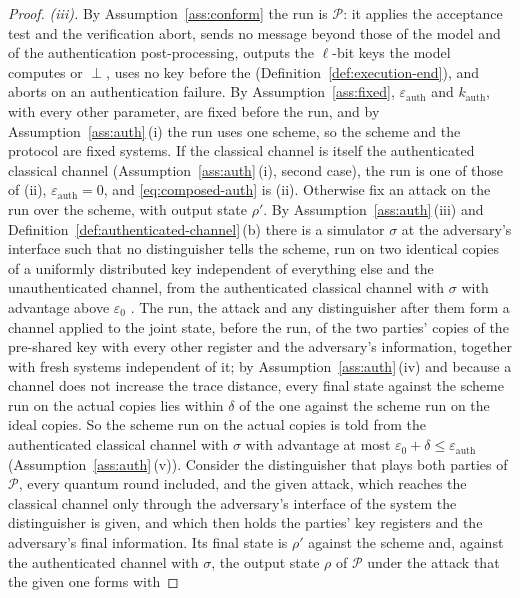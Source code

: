 \begin{proof}
\emph{(iii).} By Assumption~\ref{ass:conform} the run is $\mathcal P$: it
applies the acceptance test and the verification abort, sends no message
beyond those of the model and of the authentication post-processing,
outputs the $\ell$-bit keys the model computes or $\perp$, uses no key
before the  (Definition~\ref{def:execution-end}),
and aborts on an authentication failure. By
Assumption~\ref{ass:fixed}, $\varepsilon_{\mathrm{auth}}$ and
$k_{\mathrm{auth}}$, with every other parameter, are fixed before the run,
and by Assumption~\ref{ass:auth}\,(i) the run uses one scheme, so the scheme
and the protocol are fixed systems. If the classical channel
is itself the authenticated classical channel
(Assumption~\ref{ass:auth}\,(i), second case), the run is one of those of
(ii), $\varepsilon_{\mathrm{auth}}=0$, and \eqref{eq:composed-auth} is (ii).
Otherwise fix an attack on the run over the scheme, with output state
$\rho'$. By Assumption~\ref{ass:auth}\,(iii) and
Definition~\ref{def:authenticated-channel}\,(b) there is a simulator $\sigma$
at the adversary's interface such that no distinguisher tells the scheme,
run on two identical copies of a uniformly distributed key independent of
everything else and the unauthenticated channel, from the authenticated classical channel
with $\sigma$ with advantage above $\varepsilon_0$
\cite[Sec.~II.E, Def.~1; Sec.~II.F, Eqs.~(4)--(6)]{portmann2022security}.
The run, the attack and any distinguisher after them form a channel applied
to the joint state, before the run, of the two parties' copies of the
pre-shared key with every other register and the adversary's information, together with fresh systems
independent of it; by Assumption~\ref{ass:auth}\,(iv) and because a channel
does not increase the trace distance, every final state against the scheme
run on the actual copies lies within $\delta$ of the one against the scheme
run on the ideal copies. So the scheme run on the actual copies is told from
the
authenticated classical channel with $\sigma$ with advantage at most
$\varepsilon_0+\delta\le\varepsilon_{\mathrm{auth}}$
(Assumption~\ref{ass:auth}\,(v)).
Consider the distinguisher that plays both parties of $\mathcal P$, every
quantum round included, and the given attack, which reaches the classical
channel only through the adversary's interface of the system the
distinguisher is given, and which then holds the parties' key registers and
the adversary's final information. Its final state is $\rho'$ against the
scheme and, against the authenticated channel with $\sigma$, the output
state $\rho$ of $\mathcal P$ under the attack that the given one forms with

\end{proof}
